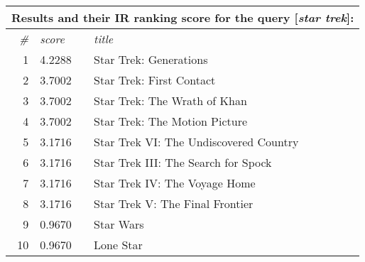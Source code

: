 \begin{table}[h]
  \centering 

  \begin{tabular*}{0.9\textwidth}{ r l p{8cm} }
    \multicolumn{3}{l}{Results and their IR ranking score for the query [\emph{star trek}]:}\\
    \toprule
    \emph{\#} & \emph{score} & \emph{title}\\
    \midrule
    1 & 4.2288 & Star Trek: Generations                 \\
    2 & 3.7002 & Star Trek: First Contact               \\
    3 & 3.7002 & Star Trek: The Wrath of Khan           \\
    4 & 3.7002 & Star Trek: The Motion Picture          \\
    5 & 3.1716 & Star Trek VI: The Undiscovered Country \\
    6 & 3.1716 & Star Trek III: The Search for Spock    \\
    7 & 3.1716 & Star Trek IV: The Voyage Home          \\
    8 & 3.1716 & Star Trek V: The Final Frontier        \\
    9 & 0.9670 & Star Wars                              \\
    10& 0.9670 & Lone Star                              \\
    \bottomrule
  \end{tabular*}

  \vspace{1em} 


\end{table}
